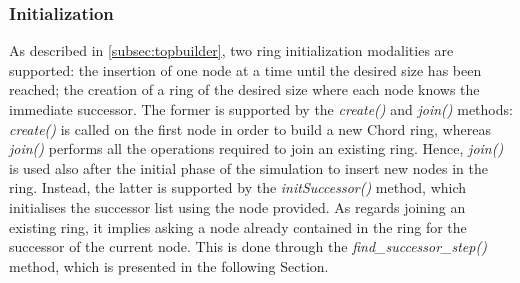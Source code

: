 \documentclass[11pt,twocolumn,letterpaper]{article}
\begin{document}
	\subsubsection{Initialization}
	\label{subsubsec:init}
	As described in \cref{subsec:topbuilder}, two ring initialization modalities are supported: the insertion of one node at a time until the desired size has been reached; the creation of a ring of the desired size where each node knows the immediate successor. \newline
	The former is supported by the \textit{create()} and \textit{join()} methods: \textit{create()} is called on the first node in order to build a new Chord ring, whereas \textit{join()} performs all the operations required to join an existing ring. Hence, \textit{join()} is used also after the initial phase of the simulation to insert new nodes in the ring. \newline
	Instead, the latter is supported by the \textit{initSuccessor()} method, which initialises the successor list using the node provided. \newline
	As regards joining an existing ring, it implies asking a node already contained in the ring for the successor of the current node. This is done through the \textit{find\_successor\_step()} method, which is presented in the following Section.
	
\end{document}
